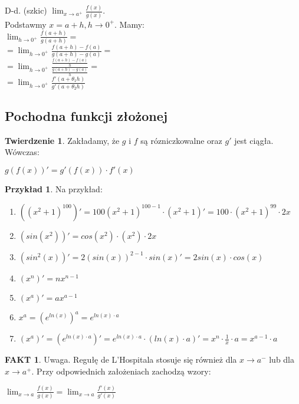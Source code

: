 \documentclass{article}
\theoremstyle{definition}
\theoremstyle{definition}
\newtheorem{tw}{Twierdzenie}[subsection]
\theoremstyle{definition}
\newtheorem{pk}{Przykład}[subsection]
\theoremstyle{definition}
\newtheorem*{fakt}{FAKT}
\begin{document}
D-d. (szkic)
$\lim_{x\rightarrow a^+} \frac{f(x)}{g(x)}$.\\
Podstawmy $x=a+h, h\rightarrow 0^+$. Mamy:\\
$\lim_{h\rightarrow 0^+} \frac{f(a+h)}{g(a+h)}=$\\
$=\lim_{h\rightarrow 0^+} \frac{f(a+h)-f(a)}{g(a+h)-g(a)}=$\\
$=\lim_{h\rightarrow 0^+} \frac{\frac{f(a+h)-f(a)}{h}}{\frac{g(a+h)-g(a)}{h}}=$\\
$=\lim_{h\rightarrow 0^+} \frac{f'(a+\theta_1h)}{g'(a+\theta_2 h)}$

\subsection{Pochodna funkcji złożonej}

\begin{tw}
    Zakładamy, że $g$ i $f$ są rózniczkowalne oraz $g'$ jest ciągła. Wówczas:
    \begin{center}
        $g(f(x))'=g'(f(x))\cdot f'(x)$
    \end{center}
\end{tw}

\begin{pk}
    Na przykład:\\
    \begin{enumerate}
        \item $\left(\left(x^2+1\right)^100\right)'=100(x^2+1)^{100-1}\cdot(x^2+1)'=100\cdot(x^2+1)^99\cdot 2x$
        \item $\left(sin(x^2)\right)'=cos(x^2)\cdot(x^2)\cdot 2x$
        \item $\left(sin^2(x)\right)'=2(sin(x))^{2-1}\cdot sin(x)'=2sin(x)\cdot cos(x)$
        \item $(x^n)'=nx^{n-1}$
        \item $(x^a)'=ax^{a-1}$
        \item $x^a=(e^{ln(x)})^{a}=e^{ln(x)\cdot a}$
        \item $(x^a)'=\left(e^{ln(x)\cdot a}\right)'=e^{ln(x)\cdot a}\cdot \left(ln(x)\cdot a\right)'=x^n\cdot\frac{1}{x}\cdot a= x^{a-1}\cdot a$
    \end{enumerate}
\end{pk}

\begin{fakt}
    Uwaga. Regułę de L'Hospitala stosuje się również dla $x\rightarrow a^-$ lub dla $x\rightarrow a^+$. Przy odpowiednich założeniach zachodzą wzory:
    \begin{center}
        $\lim_{x\rightarrow a} \frac{f(x)}{g(x)} = \lim_{x\rightarrow a} \frac{f'(x)}{g'(x)}$
    \end{center}
\end{fakt}
\end{document}

